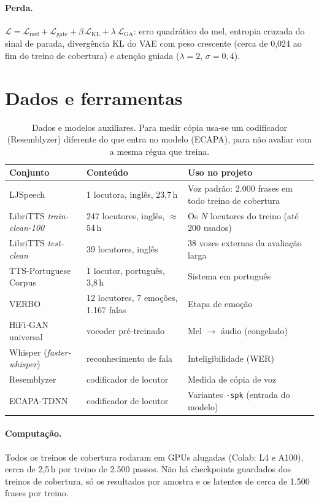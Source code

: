 \documentclass[a4paper,11pt]{article}
\begin{document}
\paragraph{Perda.} $\mathcal{L} = \mathcal{L}_{\text{mel}} + \mathcal{L}_{\text{gate}} + \beta\,\mathcal{L}_{\text{KL}} + \lambda\,\mathcal{L}_{\text{GA}}$: erro quadrático do mel, entropia cruzada do sinal de parada, divergência KL do VAE com peso crescente (cerca de 0,024 ao fim do treino de cobertura) e atenção guiada ($\lambda = 2$, $\sigma=0{,}4$).

\section{Dados e ferramentas}

\begin{table}[H]
\centering\small
\begin{tabular}{@{}p{3.6cm}p{4.4cm}p{7.6cm}@{}}
\toprule
Conjunto & Conteúdo & Uso no projeto\\
\midrule
LJSpeech & 1 locutora, inglês, 23,7\,h & Voz padrão: 2.000 frases em todo treino de cobertura\\
LibriTTS \textit{train-clean-100} & 247 locutores, inglês, $\approx$54\,h & Os $N$ locutores do treino (até 200 usados)\\
LibriTTS \textit{test-clean} & 39 locutores, inglês & 38 vozes externas da avaliação larga\\
TTS-Portuguese Corpus & 1 locutor, português, 3,8\,h & Sistema em português\\
VERBO & 12 locutores, 7 emoções, 1.167 falas & Etapa de emoção\\
\midrule
HiFi-GAN universal & vocoder pré-treinado & Mel $\rightarrow$ áudio (congelado)\\
Whisper (\textit{faster-whisper}) & reconhecimento de fala & Inteligibilidade (WER)\\
Resemblyzer & codificador de locutor & Medida de cópia de voz\\
ECAPA-TDNN & codificador de locutor & Variantes \texttt{-spk} (entrada do modelo)\\
\bottomrule
\end{tabular}
\caption{Dados e modelos auxiliares. Para medir cópia usa-se um codificador (Resemblyzer) diferente do que entra no modelo (ECAPA), para não avaliar com a mesma régua que treina.}
\end{table}

\paragraph{Computação.} Todos os treinos de cobertura rodaram em GPUs alugadas (Colab: L4 e A100), cerca de 2,5\,h por treino de 2.500 passos. Não há checkpoints guardados dos treinos de cobertura, só os resultados por amostra e os latentes de cerca de 1.500 frases por treino.
\end{document}
